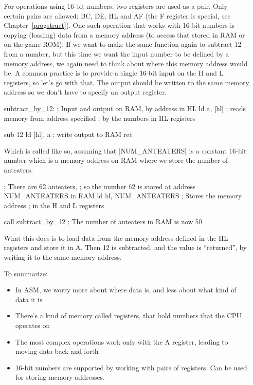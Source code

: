 \documentclass[11pt]{book}
\begin{document}
For operations using 16-bit numbers, two registers are used as a pair. Only certain pairs are allowed: BC, DE, HL and AF (the F register is special, see Chapter~\ref{progstruct}). One such operation that works with 16-bit numbers is copying (loading) data from a memory address (to access that stored in RAM or on the game ROM). If we want to make the same function again to subtract 12 from a number, but this time we want the input number to be defined by a memory address, we again need to think about where this memory address would be. A common practice is to provide a single 16-bit input on the H and L registers, so let's go with that. The output should be written to the same memory address so we don't have to specify an output register.

\begin{code}
subtract_by_12:
    ; Input and output on RAM, by address in HL
    ld a, [hl] ; reads memory from address specified 
    ; by the numbers in HL registers 
    
    sub 12 
    ld [hl], a ; write output to RAM
    ret 
\end{code}

Which is called like so, assuming that |NUM_ANTEATERS| is a constant 16-bit number which is a memory address on RAM where we store the number of anteaters:

\begin{code}
; There are 62 anteaters,
; so the number 62 is stored at address NUM_ANTEATERS in RAM
ld hl, NUM_ANTEATERS ; Stores the memory address 
; in the H and L registers

call subtract_by_12
; The number of anteaters in RAM is now 50 
\end{code}

What this does is to load data from the memory address defined in the HL registers and store it in A. Then 12 is subtracted, and the value is “returned”, by writing it to the same memory address.

To summarize: 
\begin{itemize}
\item In ASM, we worry more about where data is, and less about what kind of data it is 
\item There's a kind of memory called registers, that hold numbers that the CPU operates on
\item The most complex operations work only with the A register, leading to moving data back and forth 
\item 16-bit numbers are supported by working with pairs of registers. Can be used for storing memory addresses.
\end{itemize}
\end{document}
